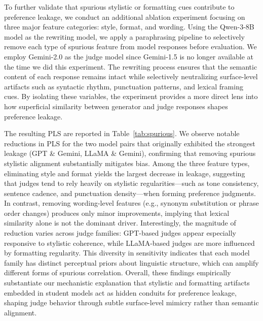 \documentclass{article} %
\begin{document}
To further validate that spurious stylistic or formatting cues contribute to preference leakage, we conduct an additional ablation experiment focusing on three major feature categories: style, format, and wording. Using the Qwen-3-8B model as the rewriting model, we apply a paraphrasing pipeline to selectively remove each type of spurious feature from model responses before evaluation. We employ Gemini-2.0 as the judge model since Gemini-1.5 is no longer available at the time we did this experiment. The rewriting process ensures that the semantic content of each response remains intact while selectively neutralizing surface-level artifacts such as syntactic rhythm, punctuation patterns, and lexical framing cues. By isolating these variables, the experiment provides a more direct lens into how superficial similarity between generator and judge responses shapes preference leakage.

The resulting PLS are reported in Table~\ref{tab:spurious}. We observe notable reductions in PLS for the two model pairs that originally exhibited the strongest leakage (GPT \& Gemini, LLaMA \& Gemini), confirming that removing spurious stylistic alignment substantially mitigates bias. Among the three feature types, eliminating style and format yields the largest decrease in leakage, suggesting that judges tend to rely heavily on stylistic regularities—such as tone consistency, sentence cadence, and punctuation density—when forming preference judgments. In contrast, removing wording-level features (e.g., synonym substitution or phrase order changes) produces only minor improvements, implying that lexical similarity alone is not the dominant driver. Interestingly, the magnitude of reduction varies across judge families: GPT-based judges appear especially responsive to stylistic coherence, while LLaMA-based judges are more influenced by formatting regularity. This diversity in sensitivity indicates that each model family has distinct perceptual priors about linguistic structure, which can amplify different forms of spurious correlation. Overall, these findings empirically substantiate our mechanistic explanation that stylistic and formatting artifacts embedded in student models act as hidden conduits for preference leakage, shaping judge behavior through subtle surface-level mimicry rather than semantic alignment.
\end{document}
